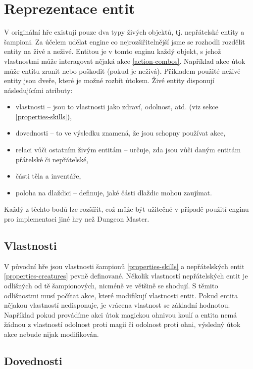 \section{Reprezentace entit}

V originální hře existují pouze dva typy živých objektů, tj. nepřátelské entity a šampioni. Za účelem udělat engine
co nejrozšiřitelnější  jsme se rozhodli rozdělit entity na živé a neživé.   
Entitou je v tomto enginu každý objekt, s jehož vlastnostmi může interagovat nějaká akce \vref{action-combos}.
Například akce útok může entitu zranit nebo poškodit  (pokud je neživá). Příkladem použité neživé entity 
jsou dveře, které je možné rozbít útokem. Živé entity disponují následujícími atributy:

\begin{itemize}
\item vlastnosti -- jsou to vlastnosti jako zdraví, odolnost,  atd.  (viz sekce \ref{properties-skills}),
\item dovednosti -- to ve výsledku znamená, že jsou schopny používat akce,
\item relaci vůči ostatním živým entitám -- určuje, zda jsou vůči daným entitám přátelské či nepřátelské,
\item části těla a inventáře,
\item poloha na dlaždici -- definuje, jaké části dlaždic mohou zaujímat.
\end{itemize}

Každý z těchto bodů lze rozšířit, což může být užitečné v případě použití enginu pro implementaci jiné hry než Dungeon Master. 

\subsection{Vlastnosti}\label{entity-properties}

V původní hře jsou vlastnosti šampionů \vref{properties-skills} a nepřátelských entit \vref{properties-creatures} pevně definované. 
Několik vlastností nepřátelských entit je odlišných od tě šampionových, nicméně ve většině se shodují.
S těmito odlišnostmi musí počítat akce, které modifikují vlastnosti entit. Pokud entita nějakou vlastností nedisponuje, je vrácena 
vlastnost se základní hodnotou. Například pokud provádíme akci útok magickou ohnivou koulí a entita nemá žádnou z vlastností
odolnost proti magii či odolnost proti ohni, výsledný útok akce nebude nijak modifikován. 

 \subsection{Dovednosti}

